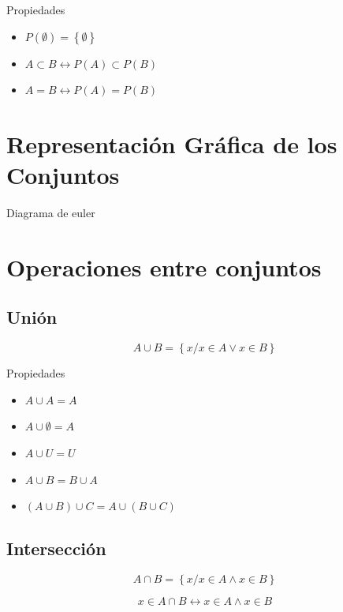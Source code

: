 \documentclass[
  16pt,
]{krantz}
\providecommand{\tightlist}{%
  \setlength{\itemsep}{0pt}\setlength{\parskip}{0pt}}
\theoremstyle{definition}
\theoremstyle{definition}
\theoremstyle{definition}
\theoremstyle{definition}
\theoremstyle{remark}
\begin{document}
Propiedades

\begin{itemize}
\tightlist
\item
  \(P(\emptyset)=\left\{\emptyset\right\}\)
\item
  \(A\subset B\leftrightarrow P(A)\subset P(B)\)
\item
  \(A= B\leftrightarrow P(A)= P(B)\)
\end{itemize}

\hypertarget{representaciuxf3n-gruxe1fica-de-los-conjuntos}{%
\section{Representación Gráfica de los Conjuntos}\label{representaciuxf3n-gruxe1fica-de-los-conjuntos}}

Diagrama de euler

\hypertarget{operaciones-entre-conjuntos}{%
\section{Operaciones entre conjuntos}\label{operaciones-entre-conjuntos}}

\hypertarget{uniuxf3n}{%
\subsection{Unión}\label{uniuxf3n}}

\[
A\cup B
=\left\{x/x\in A\vee x\in B\right\}
\]

Propiedades

\begin{itemize}
\tightlist
\item
  \(A\cup A=A\)
\item
  \(A\cup \emptyset=A\)
\item
  \(A\cup U=U\)
\item
  \(A\cup B=B\cup A\)
\item
  \((A\cup B)\cup C=A\cup(B\cup C)\)
\end{itemize}

\hypertarget{intersecciuxf3n}{%
\subsection{Intersección}\label{intersecciuxf3n}}

\[
A\cap B=\left\{x/x\in A\wedge x\in B\right\}
\]

\[
x\in A\cap B\leftrightarrow x\in A\wedge x\in B
\]
\end{document}
